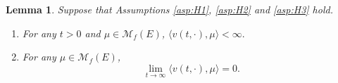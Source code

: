 \documentclass[12pt,a4paper]{amsart}
\numberwithin{equation}{section}
\theoremstyle{plain}
\newtheorem{lem}[thm]{Lemma}
\theoremstyle{definition}
\theoremstyle{remark}
\begin{document}
\begin{lem}\label{lem:extinc}
	Suppose that Assumptions \eqref{asp:H1}, \eqref{asp:H2} and \eqref{asp:H3} hold. 
\begin{enumerate}
\item	
	For any  $ t>0$ and $ \mu \in \mathcal M_f(E)$, $\langle v(t,\cdot),\mu\rangle <\infty.$ 
\item	For any $\mu \in \mathcal M_f(E)$,
\[
	\lim_{t\rightarrow\infty}\langle v(t,\cdot),\mu\rangle=0.
\]
\end{enumerate}
\end{lem}
\begin{comment}
\begin{proof} (1)
First note  that, by \eqref{eq:BGD.3},  $v(t,x)$ satisfies 
\begin{equation}
\label{eq: equation for vt}
	v(t+s,x) + \int_0^sP^\beta_{s-u}\Big(\psi_0\big(\cdot, v(t+u,\cdot)\big)\Big)(x)~{\mathrm d}u
	=P^\beta_s\big(v(t,\cdot)\big)(x),
	\quad t,s > 0, x\in E.
\end{equation}
According to \eqref{asp:H3}, we have $\langle v_t, \nu\rangle < \infty $ for $t>0$.
According to \eqref{asp:H2} and \eqref{eq: equation for vt},  for all $t >0, s>0$ and $x\in E$ we have
\begin{equation}
\label{upp}
v(t+s,x) \leq P^{\beta}_sv(t,x)
=e^{\lambda s}\phi(x)\langle v(t,\cdot),\nu\rangle(1+C^{(H2)}_{s, x, v(t, \cdot)}).
\end{equation}
Since 
\[
\sup_{x\in E, f\in L_1^+(\nu)} |C^{\eqref{asp:H2}}_{t,x,f}| 
	< \infty,
\]
it follows from \eqref{upp}\eqref{upp} that, for all $t >0, s>0$ and $\mu \in \mathcal M_f(E)$, we have
\begin{align}\label{e:l3.1}
\langle v(t +s,\cdot),\mu\rangle
	\leq  e^{\lambda s}\langle \phi,\mu\rangle(1+C^{(H2)}_{s, x, v(t, \cdot)})<\infty.
\end{align}
(2) 
Since $\lambda<0$ and 
\[
\lim_{t\to\infty}\sup_{x\in E, f\in L_1^+(\nu)} |C^{\eqref{asp:H2}}_{t,x,f}| 
	=0,
\]
the desired assertion follows immediately from \eqref{e:l3.1}.
\end{proof}
\end{comment}
\end{document}
